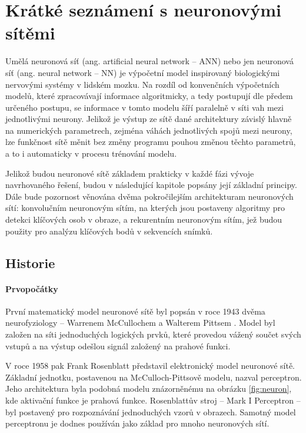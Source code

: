 \chapter{Krátké seznámení s neuronovými sítěmi}
\label{chap:NN}

Umělá neuronová síť (ang. artificial neural network – ANN) nebo jen neuronová
síť (ang. neural network – NN) je výpočetní model inspirovaný biologickými
nervovými systémy v lidském mozku. Na rozdíl od konvenčních výpočetních modelů,
které zpracovávají informace algoritmicky, a tedy postupují dle předem určeného
postupu, se informace v tomto modelu šíří paralelně v síti vah mezi
jednotlivými neurony. Jelikož je výstup ze sítě dané architektury závislý
hlavně na numerických parametrech, zejména váhách jednotlivých spojů mezi
neurony, lze funkčnost sítě měnit bez změny programu pouhou změnou těchto
parametrů, a to i automaticky v procesu trénování modelu.

Jelikož budou neuronové sítě základem prakticky v každé fázi vývoje
navrhovaného řešení, budou v následující kapitole popsány její základní
principy. Dále bude pozornost věnována dvěma pokročilejším architekturam
neuronových sítí: konvolučním neuronovým sítím, na kterých jsou postaveny
algoritmy pro detekci klíčových osob v obraze, a rekurentním neuronovým sítím,
jež budou použity pro analýzu klíčových bodů v sekvencích snímků.

\section{Historie}
\label{sec:NN_History}

\subsubsection*{Prvopočátky}
První matematický model neuronové sítě byl popsán v roce 1943 dvěma
neurofyziology – Warrenem McCullochem a Walterem Pittsem \cite{McCulloch1943}.
Model byl založen na síti jednoduchých logických prvků, které provedou vážený
součet svých vstupů a na výstup odešlou signál založený na prahové funkci.

V roce 1958 pak Frank Rosenblatt představil elektronický model neuronové sítě.
Základní jednotku, postavenou na McCulloch-Pittsově modelu, nazval perceptron.
\cite{Rosenblatt1958} Jeho architektura byla podobná modelu znázorněnému na
obrázku \ref{fig:neuron}, kde aktivační funkce je prahová funkce. Rosenblattův
stroj – Mark I Perceptron – byl postavený pro rozpoznávání jednoduchých vzorů v
obrazech.
Samotný model perceptronu je dodnes používán jako základ pro mnoho neuronových
sítí.

